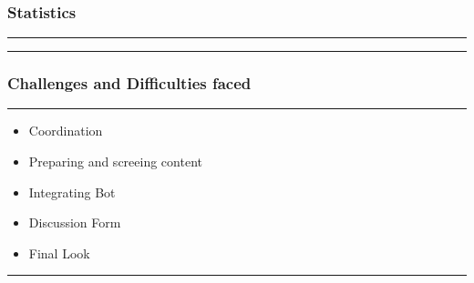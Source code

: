 \documentclass[14pt]{beamer}
\begin{document}
\begin{frame}
    \frametitle{Statistics}
    \noindent
    {\color{blue} \rule{\linewidth}{0.7mm} }
    \begin{itemize}
            \pause
    \end{itemize}
    \nonindent
    {\color{blue} \rule{\linewidth}{0.7mm} }
\end{frame}

\begin{frame}
    \frametitle{Challenges and Difficulties faced}
    \noindent
    {\color{blue} \rule{\linewidth}{0.7mm} }
    \begin{itemize}
        \pause
    \item Coordination \\
        \pause
    \item Preparing and screeing content \\
        \pause
    \item Integrating Bot \\ 
        \pause
    \item Discussion Form \\
        \pause
    \item Final Look \\
\end{itemize}
\noindent
    {\color{blue} \rule{\linewidth}{0.7mm} }
\end{frame}


    
\end{document}
